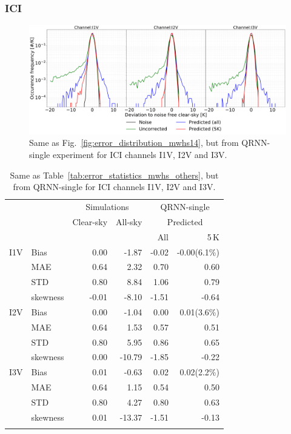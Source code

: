 \documentclass[amt, manuscript]{copernicus}
\begin{document}
\subsubsection{ICI}
%
\begin{figure}[t]
	\includegraphics[width=\textwidth]{Figures/error_distribution_QRNN-single.pdf} 
	\caption{Same as Fig.~\ref{fig:error_distribution_mwhs14}, but from QRNN-single experiment for ICI channels I1V, I2V and I3V.}
	\label{fig:error_distributions}	
\end{figure}
\begin{table}[t]
	\caption{ Same as Table~\ref{tab:error_statistics_mwhs_others}, but from QRNN-single for ICI channels I1V, I2V and I3V.}
	\label{tab:error_statistics_ici}
	\begin{tabular}{llrr|rr}
		\tophline
		&&\multicolumn{2}{c|}{Simulations}& \multicolumn{2}{c}{QRNN-single} \\
		\cline{3-6}
		&&Clear-sky &   All-sky &  \multicolumn{2}{c}{Predicted}  \\
		&&			   &			&	All & 5\,K \\
		\middlehline
		
		I1V&  Bias      &  0.00 & -1.87 & -0.02 & -0.00(6.1\%)  \\
		&MAE       &  0.64 &  2.32 &  0.70 &  0.60   \\
		&STD       &  0.80 &  8.84 &  1.06 &  0.79   \\
		&skewness & -0.01 & -8.10 & -1.51 & -0.64  \\
		\middlehline
		I2V & Bias      & 0.00 &  -1.04 &  0.00 &  0.01(3.6\%)  \\
		&MAE       & 0.64 &   1.53 &  0.57 &  0.51 \\
		&STD       & 0.80 &   5.95 &  0.86 &  0.65 \\
		&skewness & 0.00 & -10.79 & -1.85 & -0.22  \\
		\middlehline	
		I3V & Bias      & 0.01 &  -0.63 &  0.02 &  0.02(2.2\%)  \\
		&MAE       & 0.64 &   1.15 &  0.54 &  0.50  \\
		&STD       & 0.80 &   4.27 &  0.80 &  0.63  \\
		&skewness & 0.01 & -13.37 & -1.51 & -0.13  \\
		\bottomhline
	\end{tabular}
	\belowtable{} %
\end{table}
\end{document}
